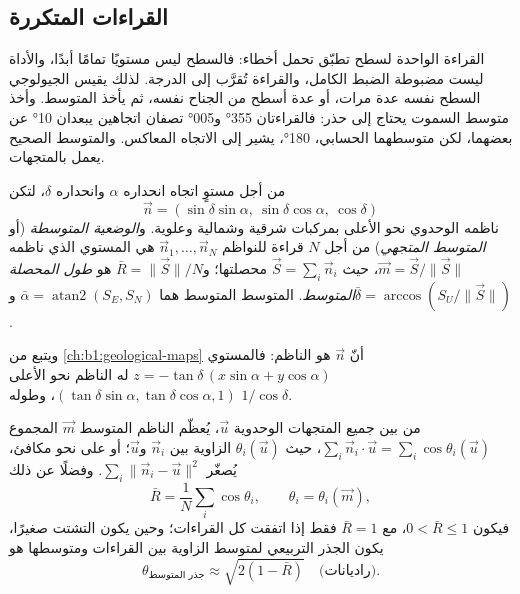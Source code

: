 \subsection{القراءات المتكررة}

القراءة الواحدة لسطح تطبّق تحمل أخطاء: فالسطح ليس مستويًا تمامًا أبدًا، والأداة ليست مضبوطة الضبط الكامل، والقراءة تُقرَّب إلى الدرجة. لذلك يقيس الجيولوجي السطح نفسه عدة مرات، أو عدة أسطح من الجناح نفسه، ثم يأخذ المتوسط. وأخذ متوسط السموت يحتاج إلى حذر: فالقراءتان \ang{355} و\ang{005} تصفان اتجاهين يبعدان \ang{10} عن بعضهما، لكن متوسطهما الحسابي، \ang{180}، يشير إلى الاتجاه المعاكس. والمتوسط الصحيح يعمل بالمتجهات.

\begin{definition}\label{def:b1:field-lab-methods-1:mean-orientation}
من أجل مستوٍ اتجاه انحداره $\alpha$ وانحداره $\delta$، لتكن
\[
  \vec n = (\sin\delta\sin\alpha,\ \sin\delta\cos\alpha,\ \cos\delta)
\]
ناظمه الوحدوي نحو الأعلى بمركبات شرقية وشمالية وعلوية. و\emph{الوضعية المتوسطة} (أو \emph{المتوسط المتجهي}) من أجل $N$ قراءة للنواظم $\vec n_1, \dots, \vec n_N$ هي المستوي الذي ناظمه
$\vec m = \vec S/\|\vec S\|$، حيث $\vec S = \sum_i \vec n_i$ محصلتها؛ و$\bar R = \|\vec S\|/N$ هو \emph{طول المحصلة المتوسط}.  المتوسط  المتوسط هما $\bar\alpha = \operatorname{atan2}(S_E, S_N)$
و$\bar\delta = \arccos(S_U/\|\vec S\|)$.
\end{definition}

ويتبع من \cref{ch:b1:geological-maps} أنّ $\vec n$ هو الناظم: فالمستوي $z = -\tan\delta\,(x\sin\alpha + y\cos\alpha)$ له الناظم نحو الأعلى
$(\tan\delta\sin\alpha, \tan\delta\cos\alpha, 1)$، وطوله $1/\cos\delta$.

\begin{proposition}\label{prop:b1:field-lab-methods-1:vector-mean}
من بين جميع المتجهات الوحدوية $\vec u$، يُعظّم الناظم المتوسط $\vec m$ المجموع
$\sum_i \vec n_i\cdot\vec u = \sum_i \cos\theta_i(\vec u)$، حيث $\theta_i(\vec u)$ الزاوية بين $\vec n_i$ و$\vec u$؛ أو على نحو مكافئ، يُصغّر $\sum_i \|\vec n_i - \vec u\|^2$. وفضلًا عن ذلك
\[
  \bar R = \frac1N\sum_i \cos\theta_i, \qquad \theta_i = \theta_i(\vec m),
\]
فيكون $0 < \bar R \le 1$، مع $\bar R = 1$ فقط إذا اتفقت كل القراءات؛ وحين يكون التشتت صغيرًا، يكون الجذر التربيعي لمتوسط الزاوية بين القراءات ومتوسطها هو
\[
  \theta_{\text{جذر المتوسط}} \approx \sqrt{2(1 - \bar R)} \quad\text{(راديانات)}.
\]
\end{proposition}

